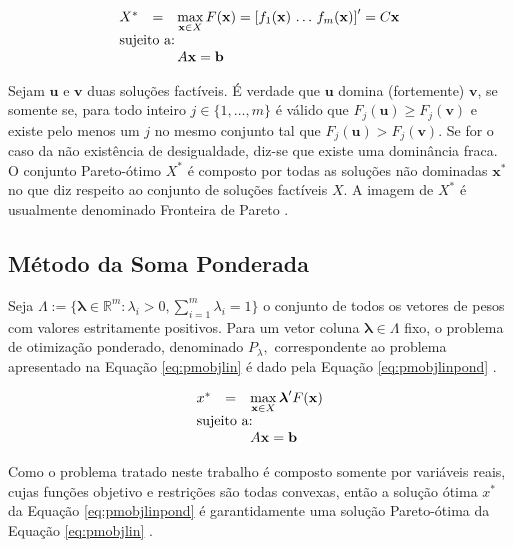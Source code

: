 \documentclass [11pt]{articleSBPO}
\begin{document}
\begin{equation}
\begin{array}{lll}
X^{*} & = & \displaystyle\max_{\mathbf{x} \in X} F(\mathbf{x}) = \left[ f_1(\mathbf{x}) \, \ldots \, f_m(\mathbf{x}) \right]' = C \mathbf{x} \\
\multicolumn{3}{l}{\mbox{sujeito a:}} \\
& & A \mathbf{x} = \mathbf{b}
\end{array}
\label{eq:pmobjlin}
\end{equation}

Sejam $\mathbf{u}$ e $\mathbf{v}$ duas soluções factíveis. É verdade que $\mathbf{u}$ domina (fortemente) $\mathbf{v}$, se somente se, para todo inteiro $j \in \{1, \ldots, m\}$ é válido que $F_j(\mathbf{u}) \ge F_j(\mathbf{v})$ e existe pelo menos um $j$ no mesmo conjunto tal que $F_j(\mathbf{u}) > F_j(\mathbf{v})$. Se for o caso da não existência de desigualdade, diz-se que existe uma dominância fraca. O conjunto Pareto-ótimo $X^{*}$ é composto por todas as soluções não dominadas $\mathbf{x}^*$ no que diz respeito ao conjunto de soluções factíveis $X$. A imagem de $X^{*}$ é usualmente denominado Fronteira de Pareto \cite{steuer1986multiple,takahashi2007otimizacao}.

\subsection{Método da Soma Ponderada}

Seja $\Lambda := \{ \boldsymbol{\lambda} \in \mathbb{R}^m: \lambda_i > 0, \sum_{i=1}^m \lambda_i = 1 \}$ o conjunto de todos os vetores de pesos com valores estritamente positivos. Para um vetor coluna $\boldsymbol{\lambda} \in \Lambda$ fixo, o problema de otimização ponderado, denominado $ P_{\lambda}, $ correspondente ao problema apresentado na Equação \ref{eq:pmobjlin} é dado pela Equação \ref{eq:pmobjlinpond} \cite{steuer1986multiple,takahashi2007otimizacao}.

\begin{equation}
\begin{array}{lll}
x^{*} & = & \displaystyle\max_{\mathbf{x} \in X} \boldsymbol{\lambda}' F(\mathbf{x}) \\
\multicolumn{3}{l}{\mbox{sujeito a:}} \\
& & A \mathbf{x} = \mathbf{b}
\end{array}
\label{eq:pmobjlinpond}
\end{equation}

Como o problema tratado neste trabalho é composto somente por variáveis reais, cujas funções objetivo e restrições são todas convexas, então a solução ótima $x^{*}$ da Equação \ref{eq:pmobjlinpond} é garantidamente uma solução Pareto-ótima da Equação \ref{eq:pmobjlin} \cite{steuer1986multiple,takahashi2007otimizacao}.
\end{document}
